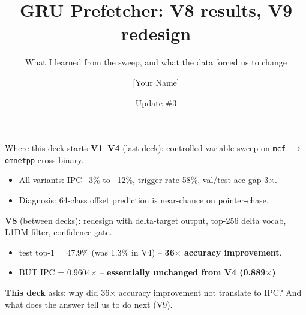 \documentclass[10pt,aspectratio=169]{beamer}
\title{GRU Prefetcher: V8 results, V9 redesign}
\subtitle{What I learned from the sweep, and what the data forced us to change}
\author{[Your Name]}
\institute{Advisor: [Boss Name]}
\date{Update \#3}
\begin{document}
\begin{frame}\titlepage\end{frame}

\begin{frame}{Where this deck starts}
  \textbf{V1--V4} (last deck): controlled-variable sweep on \texttt{mcf $\to$ omnetpp} cross-binary.
  \begin{itemize}\small
    \item All variants: IPC --3\% to --12\%, trigger rate 58\%, val/test acc gap 3$\times$.
    \item Diagnosis: 64-class offset prediction is near-chance on pointer-chase.
  \end{itemize}

  \vspace{0.6em}
  \textbf{V8} (between decks): redesign with delta-target output, top-256 delta vocab, L1DM filter, confidence gate.
  \begin{itemize}\small
    \item test top-1 = 47.9\% (was 1.3\% in V4) -- \textbf{36$\times$ accuracy improvement}.
    \item BUT IPC = 0.9604$\times$ -- \textbf{essentially unchanged from V4 (0.889$\times$)}.
  \end{itemize}

  \vspace{0.6em}
  \textbf{This deck} asks: why did 36$\times$ accuracy improvement not translate to IPC?
  And what does the answer tell us to do next (V9).
\end{frame}
\end{document}
